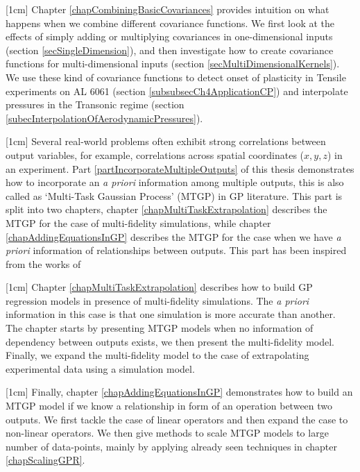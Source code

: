 [1cm]
Chapter \ref{chapCombiningBasicCovariances} provides intuition on what happens when we combine different covariance functions. We first look at the effects of simply adding or multiplying covariances in one-dimensional inputs (section \ref{secSingleDimension}), and then investigate how to create covariance functions for multi-dimensional inputs (section \ref{secMultiDimensionalKernels}). We use these kind of covariance functions to detect onset of plasticity in Tensile experiments on AL 6061 (section \ref{subsubsecCh4ApplicationCP}) and interpolate pressures in the Transonic regime (section \ref{subecInterpolationOfAerodynamicPressures}). 

[1cm]
Several real-world problems often exhibit strong correlations between output variables, for example, correlations across spatial coordinates ($x, y, z$) in an experiment. Part \ref{partIncorporateMultipleOutputs} of this thesis demonstrates how to incorporate an \textit{a priori} information among multiple outputs, this is also called as `Multi-Task Gaussian Process' (MTGP) in GP literature. This part is split into two chapters, chapter \ref{chapMultiTaskExtrapolation} describes the MTGP for the case of multi-fidelity simulations, while chapter \ref{chapAddingEquationsInGP} describes the MTGP for the case when we have \textit{a priori} information of relationships between outputs. This part has been inspired from the works of \cite{forrester2007multi, alvarez2011kernels, bonilla_multi-task_2008, Boyle05dependentgaussian, kennedy2000predicting, le2013multi, Constantinescu2013, journals/jmlr/AlvarezLL09, jidling2017linearly, ginsbourger2013invariances, sarkka2011linear}

[1cm]
Chapter \ref{chapMultiTaskExtrapolation} describes how to build GP regression models in presence of multi-fidelity simulations. The \textit{a priori} information in this case is that one simulation is more accurate than another. The chapter starts by presenting MTGP models when no information of dependency between outputs exists, we then present the multi-fidelity model. Finally, we expand the multi-fidelity model to the case of extrapolating experimental data using a simulation model. 

[1cm]
Finally, chapter \ref{chapAddingEquationsInGP} demonstrates how to build an MTGP model if we know a relationship in form of an operation between two outputs. We first tackle the case of linear operators and then expand the case to non-linear operators. We then give methods to scale MTGP models to large number of data-points, mainly by applying already seen techniques in chapter \ref{chapScalingGPR}. 

